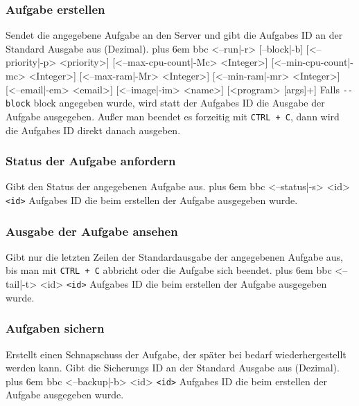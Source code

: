 \documentclass[a4paper,12pt]{article}
\makeatletter
\newenvironment{mycode}
 {\def\@xobeysp{\ }\verbatim\rightskip=0pt plus 6em\relax}
 {\endverbatim}
\makeatother
\begin{document}
\subsubsection{Aufgabe erstellen}
Sendet die angegebene \gls{Aufgabe} an den \gls{Server} und gibt die \glspl{Aufgabe} ID an der Standard Ausgabe aus (Dezimal).
\begin{mycode}
bbc <--run|-r> [--block|-b] [<--priority|-p> <priority>] [<--max-cpu-count|-Mc> <Integer>] [<--min-cpu-count|-mc> <Integer>] [<--max-ram|-Mr> <Integer>] [<--min-ram|-mr> <Integer>] [<--email|-em> <email>] [<--image|-im> <name>] [<program> [args]+]
\end{mycode}
Falls \texttt{-{}-block} block angegeben wurde, wird statt der \glspl{Aufgabe} ID die Ausgabe der \gls{Aufgabe} ausgegeben.
Außer man beendet es forzeitig mit \texttt{CTRL + C}, dann wird die \glspl{Aufgabe} ID direkt danach ausgeben.

\subsubsection{Status der \gls{Aufgabe} anfordern}
Gibt den Status der angegebenen \gls{Aufgabe} aus.
\begin{mycode}
bbc <--status|-s> <id>
\end{mycode}
\texttt{<id>} \glspl{Aufgabe} ID die beim erstellen der \gls{Aufgabe} ausgegeben wurde.

\subsubsection{Ausgabe der \gls{Aufgabe} ansehen}
Gibt nur die letzten Zeilen der Standardausgabe der angegebenen \gls{Aufgabe} aus, bis man mit \texttt{CTRL + C} abbricht oder die \gls{Aufgabe} sich beendet.
\begin{mycode}
bbc <--tail|-t> <id>
\end{mycode}
\texttt{<id>} \glspl{Aufgabe} ID die beim erstellen der \gls{Aufgabe} ausgegeben wurde.

\subsubsection{Aufgaben sichern}
Erstellt einen Schnapschuss der \gls{Aufgabe}, der später bei bedarf wiederhergestellt werden kann.
Gibt die Sicherungs ID an der Standard Ausgabe aus (Dezimal).
\begin{mycode}
bbc <--backup|-b> <id>
\end{mycode}
\texttt{<id>} \glspl{Aufgabe} ID die beim erstellen der \gls{Aufgabe} ausgegeben wurde.
\end{document}
